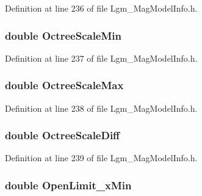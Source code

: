 Definition at line 236 of file Lgm\_\-MagModelInfo.h.\hypertarget{struct_lgm___mag_model_info_010feefec439ccf0a4dbb5b3d1599e36}{
\subsubsection[{OctreeScaleMin}]{\setlength{\rightskip}{0pt plus 5cm}double {\bf OctreeScaleMin}}}
\label{struct_lgm___mag_model_info_010feefec439ccf0a4dbb5b3d1599e36}




Definition at line 237 of file Lgm\_\-MagModelInfo.h.\hypertarget{struct_lgm___mag_model_info_0310164485c1dbf6298b11f23531d42f}{
\subsubsection[{OctreeScaleMax}]{\setlength{\rightskip}{0pt plus 5cm}double {\bf OctreeScaleMax}}}
\label{struct_lgm___mag_model_info_0310164485c1dbf6298b11f23531d42f}




Definition at line 238 of file Lgm\_\-MagModelInfo.h.\hypertarget{struct_lgm___mag_model_info_593eb3c7aeb022b668650a364f4a436e}{
\subsubsection[{OctreeScaleDiff}]{\setlength{\rightskip}{0pt plus 5cm}double {\bf OctreeScaleDiff}}}
\label{struct_lgm___mag_model_info_593eb3c7aeb022b668650a364f4a436e}




Definition at line 239 of file Lgm\_\-MagModelInfo.h.\hypertarget{struct_lgm___mag_model_info_7d6b092f69ab45a5532b1bbc137afd0c}{
\subsubsection[{OpenLimit\_\-xMin}]{\setlength{\rightskip}{0pt plus 5cm}double {\bf OpenLimit\_\-xMin}}}
\label{struct_lgm___mag_model_info_7d6b092f69ab45a5532b1bbc137afd0c}




